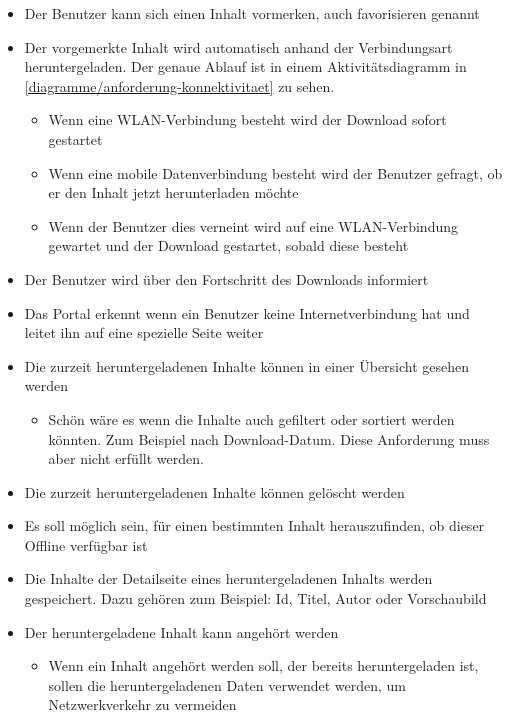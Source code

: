 \begin{itemize}
	\item Der Benutzer kann sich einen Inhalt vormerken, auch favorisieren genannt
	\item Der vorgemerkte Inhalt wird automatisch anhand der Verbindungsart heruntergeladen. Der genaue Ablauf ist in einem Aktivitätsdiagramm in \autoref{diagramme/anforderung-konnektivitaet} zu sehen.
	
	\begin{itemize}
		\item Wenn eine WLAN-Verbindung besteht wird der Download sofort gestartet
		\item Wenn eine mobile Datenverbindung besteht wird der Benutzer gefragt, ob er den Inhalt jetzt herunterladen möchte
		\item Wenn der Benutzer dies verneint wird auf eine WLAN-Verbindung gewartet und der Download gestartet, sobald diese besteht
	\end{itemize}
	

	\item Der Benutzer wird über den Fortschritt des Downloads informiert
	\item Das Portal erkennt wenn ein Benutzer keine Internetverbindung hat und leitet ihn auf eine spezielle Seite weiter
	\item Die zurzeit heruntergeladenen Inhalte können in einer Übersicht gesehen werden
	\begin{itemize}
		\item Schön wäre es wenn die Inhalte auch gefiltert oder sortiert werden könnten. Zum Beispiel nach Download-Datum. Diese Anforderung muss aber nicht erfüllt werden.
	\end{itemize}
 	\item Die zurzeit heruntergeladenen Inhalte können gelöscht werden
	\item Es soll möglich sein, für einen bestimmten Inhalt herauszufinden, ob dieser Offline verfügbar ist
	\item Die Inhalte der Detailseite eines heruntergeladenen Inhalts werden gespeichert. Dazu gehören zum Beispiel: Id, Titel, Autor oder Vorschaubild
	\item Der heruntergeladene Inhalt kann angehört werden
	\begin{itemize}
		\item Wenn ein Inhalt angehört werden soll, der bereits heruntergeladen ist, sollen die heruntergeladenen Daten verwendet werden, um Netzwerkverkehr zu vermeiden
	\end{itemize}
	
\end{itemize}
